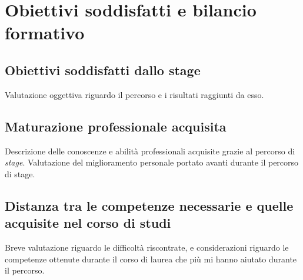 \chapter{Obiettivi soddisfatti e bilancio formativo}

\section{Obiettivi soddisfatti dallo stage}

Valutazione oggettiva riguardo il percorso e i risultati raggiunti da esso.

\section{Maturazione professionale acquisita}

Descrizione delle conoscenze e abilità professionali acquisite grazie al percorso di \textit{stage}.
Valutazione del miglioramento personale portato avanti durante il percorso di stage.


\section{Distanza tra le competenze necessarie e quelle acquisite nel corso di studi}

Breve valutazione riguardo le difficoltà riscontrate, e considerazioni riguardo le competenze ottenute durante il corso di laurea che più mi hanno aiutato durante il percorso.
